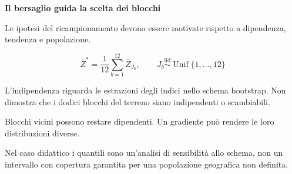 \documentclass[12pt,aspectratio=1610]{beamer}
\newcommand{\PBody}[1]{\par{\fontsize{11.3}{14.8}\selectfont #1\par}}
\newcommand{\PSmall}[1]{\par{\fontsize{9.8}{13.1}\selectfont #1\par}}
\newcommand{\PInfo}[1]{%
\begin{tcolorbox}[enhanced,arc=1.6mm,boxrule=.55pt,colback=GeoTint,
 colframe=Rule!80!Classical,left=2.3mm,right=2.3mm,top=2mm,bottom=2mm,
 before skip=1mm,after skip=1mm]
\PSmall{#1}\end{tcolorbox}}
\begin{document}
\begin{frame}[plain]\hypertarget{slide100}{}
\begin{lrbox}{\TitleBox}
\begin{minipage}[t]{17.7cm}\raggedright\color{Ink}\fontsize{11.3}{14.8}\selectfont
\color{Navy}\bfseries\fontsize{20.6}{24.5}\selectfont Il bersaglio guida la scelta dei blocchi
\end{minipage}\end{lrbox}

\begin{lrbox}{\RecallBox}
\begin{minipage}[t]{14.3cm}\raggedright\color{Ink}\fontsize{11.3}{14.8}\selectfont
\fontsize{10.3}{13.8}\selectfont Le ipotesi del ricampionamento devono essere motivate rispetto a dipendenza, tendenza e popolazione.
\end{minipage}\end{lrbox}

\begin{lrbox}{\PilotLeftBox}
\begin{minipage}[t]{10.05cm}\raggedright\color{Ink}\fontsize{11.3}{14.8}\selectfont
\[\overline Z^*=\frac1{12}\sum_{b=1}^{12}\overline Z_{J_b},
 \qquad J_b\overset{\mathrm{iid}}{\sim}\operatorname{Unif}\{1,\ldots,12\}\]
\PInfo{L’indipendenza riguarda le estrazioni degli indici nello schema bootstrap. Non dimostra che i dodici blocchi del terreno siano indipendenti o scambiabili.}

\end{minipage}\end{lrbox}

\begin{lrbox}{\PilotRightBox}
\begin{minipage}[t]{7.55cm}\raggedright\color{Ink}\fontsize{11.3}{14.8}\selectfont
\PBody{Blocchi vicini possono restare dipendenti. Un gradiente può rendere le loro distribuzioni diverse.}
\vspace{2.5mm}
\PBody{Nel caso didattico i quantili sono un’analisi di sensibilità allo schema, non un intervallo con copertura garantita per una popolazione geografica non definita.}
\vspace{2.5mm}

\end{minipage}\end{lrbox}


\end{frame}
\end{document}
